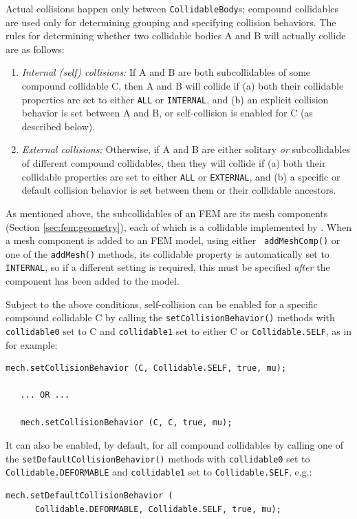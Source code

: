 Actual collisions happen only between {\tt CollidableBody}s; compound
collidables are used only for determining grouping and specifying
collision behaviors. The rules for determining whether two collidable
bodies A and B will actually collide are as follows:

\begin{enumerate}

\item {\it Internal (self) collisions:}
If A and B are both subcollidables of some compound collidable C,
then A and B will collide if (a) both their {\sf collidable}
properties are set to either {\tt ALL} or {\tt INTERNAL}, and (b) an
explicit collision behavior is set between A and B, or self-collision
is enabled for C (as described below).

\item {\it External collisions:} Otherwise, if A and B are either
solitary {\it or} subcollidables of different compound collidables,
then they will collide if (a) both their {\sf collidable} properties
are set to either {\tt ALL} or {\tt EXTERNAL}, and (b) a specific or
default collision behavior is set between them or their collidable
ancestors.

\end{enumerate}

\begin{sideblock}
As mentioned above, the subcollidables of an FEM are its mesh
components (Section \ref{sec:fem:geometry}), each of which is a
collidable implemented by 
.
When a mesh component is added to an FEM model, using either {\tt
addMeshComp()} or one of the {\tt addMesh()} methods, its {\sf
collidable} property is automatically set to {\tt INTERNAL}, so if a
different setting is required, this must be specified {\it after} the
component has been added to the model.
\end{sideblock}

Subject to the above conditions, self-collision can be enabled for a
specific compound collidable C by calling the {\tt setCollisionBehavior()}
methods with {\tt collidable0} set to C and {\tt collidable1}
set to either C or {\tt Collidable.SELF}, as in for example:
%
\begin{lstlisting}[]
   mech.setCollisionBehavior (C, Collidable.SELF, true, mu);

   ... OR ...

   mech.setCollisionBehavior (C, C, true, mu);
\end{lstlisting}
%
It can also be enabled, by default, for all compound collidables by
calling one of the {\tt setDefaultCollisionBehavior()} methods with
{\tt collidable0} set to {\tt Collidable.DEFORMABLE} and {\tt collidable1}
set to {\tt Collidable.SELF}, e.g.:
%
\begin{lstlisting}[]
   mech.setDefaultCollisionBehavior (
      Collidable.DEFORMABLE, Collidable.SELF, true, mu);
\end{lstlisting}
%

